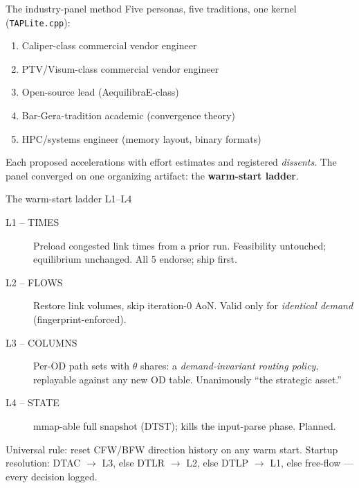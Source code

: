 \documentclass[10pt]{beamer}
\newcommand{\code}[1]{\texttt{#1}}
\begin{document}
\begin{frame}{The industry-panel method}
  Five personas, five traditions, one kernel (\code{TAPLite.cpp}):
  \begin{enumerate}
    \item Caliper-class commercial vendor engineer
    \item PTV/Visum-class commercial vendor engineer
    \item Open-source lead (AequilibraE-class)
    \item Bar-Gera-tradition academic (convergence theory)
    \item HPC/systems engineer (memory layout, binary formats)
  \end{enumerate}
  \medskip
  Each proposed accelerations with effort estimates and registered
  \emph{dissents}. The panel converged on one organizing artifact:
  the \textbf{warm-start ladder}.
\end{frame}

\begin{frame}{The warm-start ladder L1--L4}
  \begin{description}
    \item[L1 -- TIMES] Preload congested link times from a prior run.
      Feasibility untouched; equilibrium unchanged. All 5 endorse; ship first.
    \item[L2 -- FLOWS] Restore link volumes, skip iteration-0 AoN.
      Valid only for \emph{identical demand} (fingerprint-enforced).
    \item[L3 -- COLUMNS] Per-OD path sets with $\theta$ shares:
      a \emph{demand-invariant routing policy}, replayable against any new
      OD table. Unanimously ``the strategic asset.''
    \item[L4 -- STATE] mmap-able full snapshot (DTST); kills the input-parse
      phase. Planned.
  \end{description}
  \medskip
  Universal rule: reset CFW/BFW direction history on any warm start.
  Startup resolution: DTAC $\to$ L3, else DTLR $\to$ L2, else DTLP $\to$ L1,
  else free-flow --- every decision logged.
\end{frame}
\end{document}
